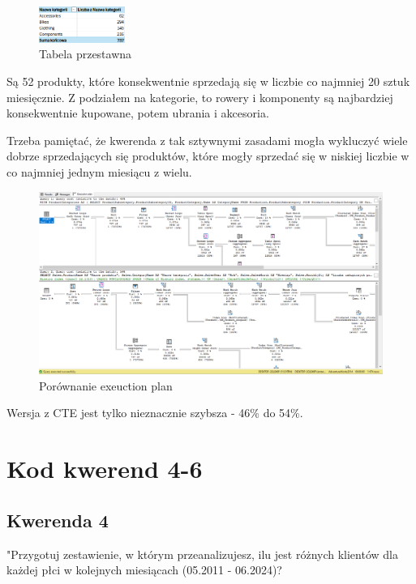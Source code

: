 \documentclass[a4paper,12pt]{article}
\begin{document}
\begin{figure}[H]
	\centering
	\includegraphics[width=0.25\textwidth]{images/3_excel.png}
	\caption{Tabela przestawna}
\end{figure}

Są 52 produkty, które konsekwentnie sprzedają się w liczbie co najmniej 20 sztuk miesięcznie. Z podziałem na kategorie, to rowery i komponenty są najbardziej konsekwentnie kupowane, potem ubrania i akcesoria.

Trzeba pamiętać, że kwerenda z tak sztywnymi zasadami mogła wykluczyć wiele dobrze sprzedających się produktów, które mogły sprzedać się w niskiej liczbie w co najmniej jednym miesiącu z wielu.

\begin{figure}[H]
	\centering
	\includegraphics[width=1.0\textwidth]{images/3_execution_plan.png}
	\caption{Porównanie exeuction plan}
\end{figure}

Wersja z CTE jest tylko nieznacznie szybsza - 46\% do 54\%.

\section{Kod kwerend 4-6}

\subsection{Kwerenda 4}

"Przygotuj zestawienie, w którym przeanalizujesz, ilu jest różnych klientów dla każdej płci w kolejnych miesiącach (05.2011 - 06.2024)?
\end{document}
